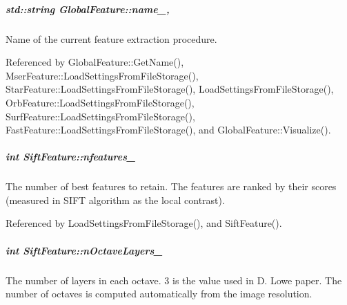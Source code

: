 \hypertarget{group___feature_extractor_abee52be830de272bd27685083bf28aae}{
\subparagraph[{name\-\_\-}]{\setlength{\rightskip}{0pt plus 5cm}std\-::string Global\-Feature\-::name\-\_\-\hspace{0.3cm}{\ttfamily [protected]}, {\ttfamily [inherited]}}}\label{group___feature_extractor_abee52be830de272bd27685083bf28aae}


Name of the current feature extraction procedure. 



Referenced by Global\-Feature\-::\-Get\-Name(), Mser\-Feature\-::\-Load\-Settings\-From\-File\-Storage(), Star\-Feature\-::\-Load\-Settings\-From\-File\-Storage(), Load\-Settings\-From\-File\-Storage(), Orb\-Feature\-::\-Load\-Settings\-From\-File\-Storage(), Surf\-Feature\-::\-Load\-Settings\-From\-File\-Storage(), Fast\-Feature\-::\-Load\-Settings\-From\-File\-Storage(), and Global\-Feature\-::\-Visualize().

\hypertarget{group___feature_extractor_a7b777845234b488ea905bd38f7ce323c}{
\subparagraph[{nfeatures\-\_\-}]{\setlength{\rightskip}{0pt plus 5cm}int Sift\-Feature\-::nfeatures\-\_\-\hspace{0.3cm}{\ttfamily [private]}}}\label{group___feature_extractor_a7b777845234b488ea905bd38f7ce323c}


The number of best features to retain. The features are ranked by their scores (measured in S\-I\-F\-T algorithm as the local contrast). 



Referenced by Load\-Settings\-From\-File\-Storage(), and Sift\-Feature().

\hypertarget{group___feature_extractor_aaf3149accfb0860cb148ea21cda53c12}{
\subparagraph[{n\-Octave\-Layers\-\_\-}]{\setlength{\rightskip}{0pt plus 5cm}int Sift\-Feature\-::n\-Octave\-Layers\-\_\-\hspace{0.3cm}{\ttfamily [private]}}}\label{group___feature_extractor_aaf3149accfb0860cb148ea21cda53c12}


The number of layers in each octave. 3 is the value used in D. Lowe paper. The number of octaves is computed automatically from the image resolution. 



